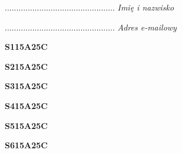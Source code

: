 \begin{turn}{90}\begin{minipage}{\linewidth} \vspace{20mm} ................................................  \textit{Imię i nazwisko}\end{minipage}\end{turn}

\begin{turn}{90}\begin{minipage}{\linewidth} \vspace{20mm} ................................................  \textit{Adres e-mailowy}\end{minipage}\end{turn}

\begin{turn}{90}\huge \begin{minipage}{\linewidth} \vspace{10mm}\textbf{S115A25C}\end{minipage}\end{turn}

\begin{turn}{90}\huge \begin{minipage}{\linewidth} \vspace{10mm}\textbf{S215A25C}\end{minipage}\end{turn}

\begin{turn}{90}\huge \begin{minipage}{\linewidth} \vspace{10mm}\textbf{S315A25C}\end{minipage}\end{turn}

\begin{turn}{90}\huge \begin{minipage}{\linewidth} \vspace{10mm}\textbf{S415A25C}\end{minipage}\end{turn}

\begin{turn}{90}\huge \begin{minipage}{\linewidth} \vspace{10mm}\textbf{S515A25C}\end{minipage}\end{turn}

\begin{turn}{90}\huge \begin{minipage}{\linewidth} \vspace{10mm}\textbf{S615A25C}\end{minipage}\end{turn}

